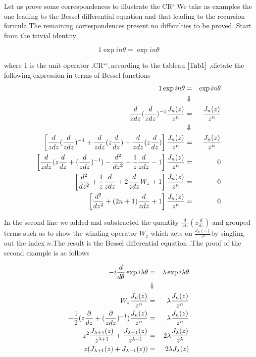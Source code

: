 \documentclass[a4paper,11pt]{article}
\begin{document}
Let us prove some correspondences to illustrate the CR$^{s}.$We take as
examples the one leading to the Bessel differential equation and that
leading to the recursion formula.The remaining correspondences present no
difficulties to be proved .Start from the trivial identity

\[
1\exp in\theta =\exp in\theta 
\]

where $1$ is the unit operator .CR`$^{s},$according to the tableau $\ref%
{Tab1}$ ,dictate the following expression in terms of Bessel functions%
\begin{eqnarray*}
1\exp in\theta &=&\exp in\theta \\
&\Downarrow & \\
\frac{d}{zdz}(\frac{d}{zdz})^{-1}\frac{J_{n}(z)}{z^{n}} &=&\frac{J_{n}(z)}{%
z^{n}} \\
&\Downarrow & \\
\left[ \frac{d}{zdz}(\frac{d}{zdz})^{-1}+\frac{d}{zdz}(z\frac{d}{dz})-\frac{d%
}{zdz}(z\frac{d}{dz})\right] \frac{J_{n}(z)}{z^{n}} &=&\frac{J_{n}(z)}{z^{n}}
\\
\left[ \frac{d}{zdz}(z\frac{d}{dz}+(\frac{d}{zdz})^{-1})-\frac{d^{2}}{dz^{2}}%
-\frac{1}{z}\frac{d}{zdz}-1\right] \frac{J_{n}(z)}{z^{n}} &=&0 \\
\left[ \frac{d^{2}}{dz^{2}}+\frac{1}{z}\frac{d}{zdz}+2\frac{d}{zdz}W_{z}+1%
\right] \frac{J_{n}(z)}{z^{n}} &=&0 \\
\left[ \frac{d^{2}}{dz^{2}}+(2n+1)\frac{d}{zdz}+1\right] \frac{J_{n}(z)}{%
z^{n}} &=&0
\end{eqnarray*}

In the second line we added and substracted the quantity $\frac{d}{zdz}(z%
\frac{d}{dz})$ and grouped terms such as to show the winding operator $W_{z}$
which acts on $\frac{J_{n}(z)}{z^{n}}$by singling out the index $n.$The
result is the Bessel differential equation .The proof of the second example
is as follows

\begin{eqnarray*}
-i\frac{d}{d\theta }\exp i\lambda \theta &=&\lambda \exp i\lambda \theta \\
&\Downarrow & \\
W_{z}\frac{J_{n}(z)}{z^{n}} &=&\lambda \frac{J_{n}(z)}{z^{n}} \\
-\frac{1}{2}(z\frac{\partial }{dz}+(\frac{\partial }{zdz})^{-1})\frac{%
J_{n}(z)}{z^{n}} &=&\lambda \frac{J_{n}(z)}{z^{n}} \\
z^{2}\frac{J_{\lambda +1}(z)}{z^{\lambda +1}}+\frac{J_{\lambda -1}(z)}{%
z^{\lambda -1}} &=&2\lambda \frac{J_{\lambda }(z)}{z^{\lambda }} \\
z(J_{\lambda +1}(z)+J_{\lambda -1}(z)) &=&2\lambda J_{\lambda }(z)
\end{eqnarray*}
\end{document}
